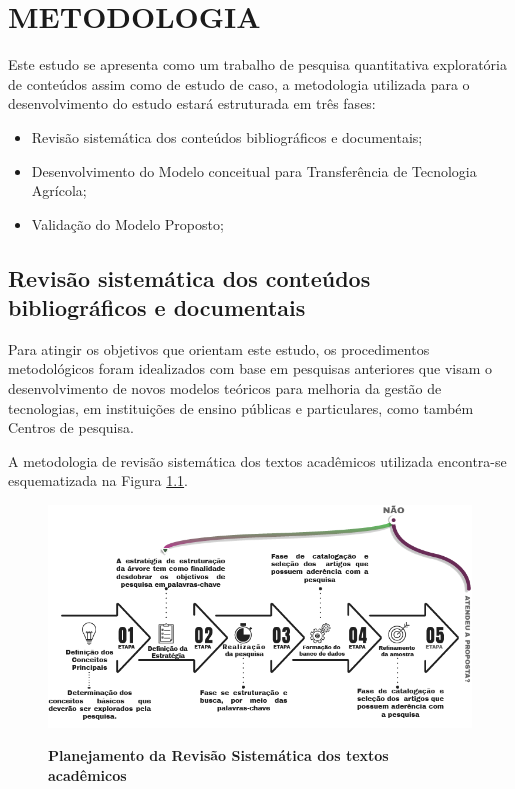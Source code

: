 \chapter{METODOLOGIA}


Este estudo se apresenta como um trabalho de pesquisa quantitativa exploratória de conteúdos assim como de estudo de caso, a metodologia utilizada para o desenvolvimento do estudo estará estruturada em três fases: 

\begin{itemize}
    \item Revisão sistemática dos conteúdos bibliográficos e documentais;
    \item Desenvolvimento do Modelo conceitual para Transferência de Tecnologia Agrícola;
    \item Validação do Modelo Proposto;
\end{itemize}

\section{Revisão sistemática dos conteúdos bibliográficos e documentais}

Para atingir os objetivos que orientam este estudo, os procedimentos metodológicos foram idealizados com base em pesquisas anteriores que visam o desenvolvimento de novos modelos teóricos para melhoria da gestão de tecnologias, em instituições de ensino públicas e particulares, como também Centros de pesquisa. 

A metodologia de revisão sistemática dos textos acadêmicos utilizada encontra-se esquematizada na Figura \ref{figura_29}. 

\begin{figure}[H]
\centering
\caption{\textbf{Planejamento da Revisão Sistemática dos textos acadêmicos}}
\includegraphics[scale=0.6]{Imagens/fases_pesquisa_bibliografica.png}
\label{figura_29}
\end{figure}


